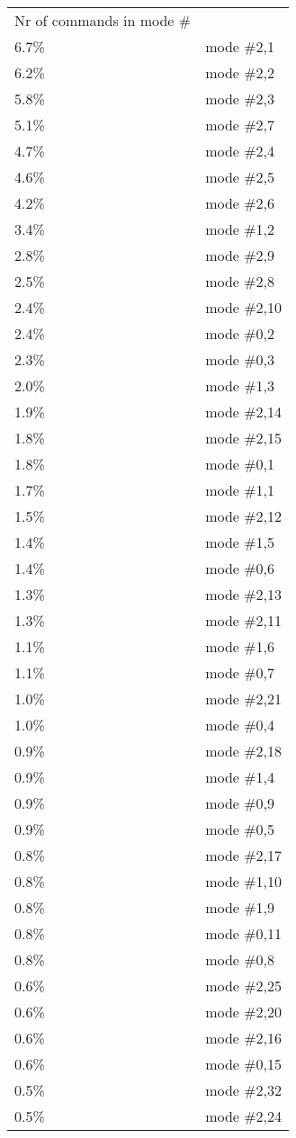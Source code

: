 \begin{longtable}{l l}
Nr of commands in mode \#\\
6.7\% & mode \#2,1\\
6.2\% & mode \#2,2\\
5.8\% & mode \#2,3\\
5.1\% & mode \#2,7\\
4.7\% & mode \#2,4\\
4.6\% & mode \#2,5\\
4.2\% & mode \#2,6\\
3.4\% & mode \#1,2\\
2.8\% & mode \#2,9\\
2.5\% & mode \#2,8\\
2.4\% & mode \#2,10\\
2.4\% & mode \#0,2\\
2.3\% & mode \#0,3\\
2.0\% & mode \#1,3\\
1.9\% & mode \#2,14\\
1.8\% & mode \#2,15\\
1.8\% & mode \#0,1\\
1.7\% & mode \#1,1\\
1.5\% & mode \#2,12\\
1.4\% & mode \#1,5\\
1.4\% & mode \#0,6\\
1.3\% & mode \#2,13\\
1.3\% & mode \#2,11\\
1.1\% & mode \#1,6\\
1.1\% & mode \#0,7\\
1.0\% & mode \#2,21\\
1.0\% & mode \#0,4\\
0.9\% & mode \#2,18\\
0.9\% & mode \#1,4\\
0.9\% & mode \#0,9\\
0.9\% & mode \#0,5\\
0.8\% & mode \#2,17\\
0.8\% & mode \#1,10\\
0.8\% & mode \#1,9\\
0.8\% & mode \#0,11\\
0.8\% & mode \#0,8\\
0.6\% & mode \#2,25\\
0.6\% & mode \#2,20\\
0.6\% & mode \#2,16\\
0.6\% & mode \#0,15\\
0.5\% & mode \#2,32\\
0.5\% & mode \#2,24\\

\end{longtable}
